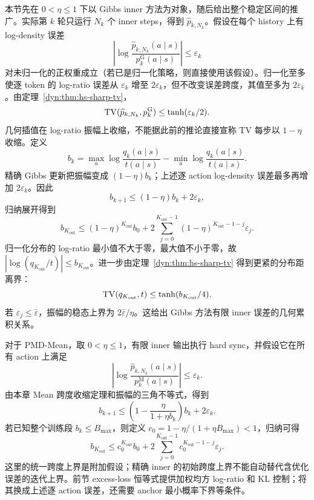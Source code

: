 本节先在 $0<\eta\leq1$ 下以 Gibbs inner 方法为对象，随后给出整个稳定区间的推广。实际第 $k$ 轮只运行 $N_k$ 个 inner steps，得到 $\widehat p_{k,N_k}$。假设在每个 history 上有 log-density 误差
\begin{equation*}
 \left|\log\frac{\widehat p_{k,N_k}(a\mid s)}{p_k^{\mathrm G}(a\mid s)}\right|\leq\varepsilon_k
\end{equation*}
对未归一化的正权重成立（若已是归一化策略，则直接使用该假设）。归一化至多使逐 token 的 log-ratio 误差从 $\varepsilon_k$ 增至 $2\varepsilon_k$，但不改变误差跨度，其值至多为 $2\varepsilon_k$。由定理~\ref{dyn:thm:hs-sharp-tv}，
\begin{equation}\label{dyn:eq:finite-inner-tv}
 \operatorname{TV}(\widehat p_{k,N_k},p_k^{\mathrm G})
 \leq \tanh(\varepsilon_k/2).
\end{equation}
几何插值在 log-ratio 振幅上收缩，不能据此前的推论直接宣称 TV 每步以 $1-\eta$ 收缩。定义
\begin{equation*}
b_k=\max_a\log\frac{q_k(a\mid s)}{t(a\mid s)}
-\min_a\log\frac{q_k(a\mid s)}{t(a\mid s)}.
\end{equation*}
精确 Gibbs 更新把振幅变成 $(1-\eta)b_k$；上述逐 action log-density 误差最多再增加 $2\varepsilon_k$。因此
\begin{equation}\label{dyn:eq:outer-error-recursion}
b_{k+1}\le(1-\eta)b_k+2\varepsilon_k,
\end{equation}
归纳展开得到
\begin{equation*}
b_{K_{\mathrm{out}}}\le(1-\eta)^{K_{\mathrm{out}}} b_0
+2\sum_{j=0}^{K_{\mathrm{out}}-1}(1-\eta)^{K_{\mathrm{out}}-1-j}\varepsilon_j.
\end{equation*}
归一化分布的 log-ratio 最小值不大于零，最大值不小于零，故 $|\log(q_{K_{\mathrm{out}}}/t)|\le b_{K_{\mathrm{out}}}$。进一步由定理~\ref{dyn:thm:hs-sharp-tv} 得到更紧的分布距离界：
\begin{equation*}
\operatorname{TV}(q_{K_{\mathrm{out}}},t)\le\tanh(b_{K_{\mathrm{out}}}/4).
\end{equation*}
若 $\varepsilon_j\le\bar\varepsilon$，振幅的稳态上界为 $2\bar\varepsilon/\eta$。这给出 Gibbs 方法有限 inner 误差的几何累积关系。

对于 PMD-Mean，取 $0<\eta\le1$，有限 inner 输出执行 hard sync，并假设它在所有 action 上满足
\begin{equation*}
\left|\log\frac{\widehat p_{k,N_k}(a\mid s)}
{p_k^{\mathrm M}(a\mid s)}\right|\le\varepsilon_k.
\end{equation*}
由本章 Mean 跨度收缩定理和振幅的三角不等式，得到
\begin{equation*}
b_{k+1}\le\left(1-\frac{\eta}{1+\eta b_k}\right)b_k+2\varepsilon_k.
\end{equation*}
若已知整个训练段 $b_k\le B_{\max}$，则定义
$c_0=1-\eta/(1+\eta B_{\max})<1$，归纳可得
\begin{equation*}
b_{K_{\mathrm{out}}}\le c_0^{K_{\mathrm{out}}}b_0
+2\sum_{j=0}^{K_{\mathrm{out}}-1}c_0^{K_{\mathrm{out}}-1-j}\varepsilon_j.
\end{equation*}
这里的统一跨度上界是附加假设；精确 inner 的初始跨度上界不能自动替代含优化误差的迭代上界。前节 excess-loss 恒等式提供加权均方 log-ratio 和 KL 控制；将其换成上述逐 action 误差，还需要 anchor 最小概率下界等条件。

